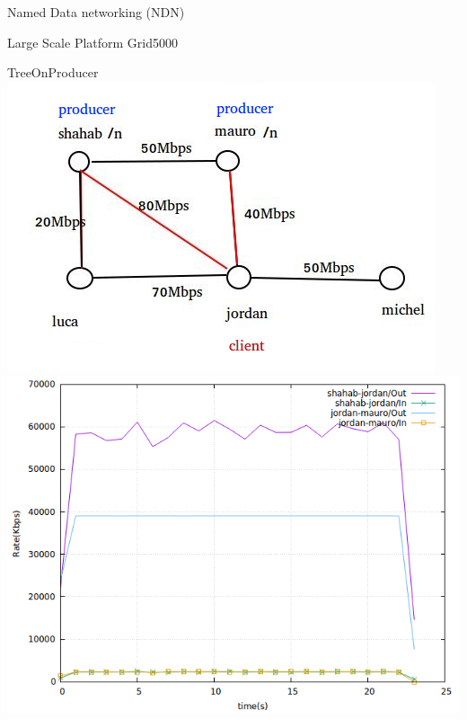 \documentclass[8pt]{beamer}
\newcommand{\1}{\mathbbm 1}
\begin{document}
\begin{frame}{Named Data networking (NDN)}
\begin{frame}{Large Scale Platform Grid5000}
\begin{frame}{TreeOnProducer}
{\includegraphics[scale=0.32]{figures/TreeOnProducer.png} 
\includegraphics[scale=0.22]{figures/treeonproducer.png} 
}
\end{frame}
\end{frame}
\end{frame}
\end{document}
